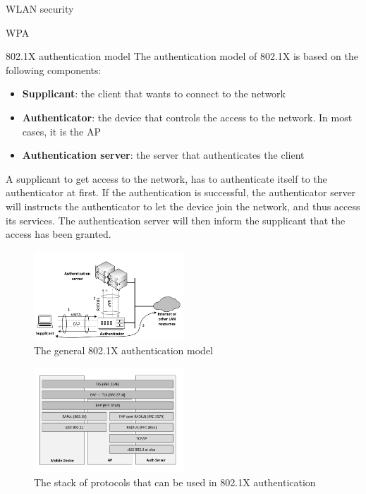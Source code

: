 \begin{section}{WLAN security}
\begin{subsection}{WPA}
    \begin{subsubsection}{802.1X authentication model}
      The authentication model of 802.1X is based on the following components:
      \begin{itemize}
        \item \textbf{Supplicant}: the client that wants to connect to the network
        \item \textbf{Authenticator}: the device that controls the access to the network. In most 
          cases, it is the AP
        \item \textbf{Authentication server}: the server that authenticates the client
      \end{itemize}
      A supplicant to get access to the network, has to authenticate itself to the authenticator 
      at first. If the authentication is successful, the authenticator server will instructs the authenticator 
      to let the device join the network, and thus access its services. The authentication server
      will then inform the supplicant that the access has been granted.\\
      \begin{figure}[h]
        \centering
        \includegraphics[width=0.5\textwidth]{img/wireless/WPA authentication.png}
        \caption{The general 802.1X authentication model}
      \end{figure}
      \begin{figure}[h]
        \centering
        \includegraphics[width=0.5\textwidth]{img/wireless/802.1X protocol stack.png}
        \caption{The stack of protocols that can be used in 802.1X authentication}
      \end{figure}

\end{subsubsection}
\end{subsection}
\end{section}
